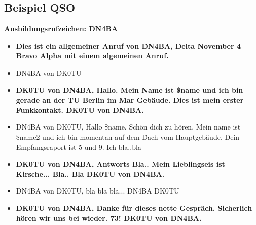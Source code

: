 \documentclass[a4paper,10pt]{article}
\begin{document}
\newpage

\subsection*{Beispiel QSO}

\textbf{Ausbildungsrufzeichen: DN4BA}

\begin{itemize}
    \item \textbf{\large Dies ist ein allgemeiner Anruf von DN4BA, Delta November 4 Bravo Alpha mit einem algemeinen Anruf.}
    \item \normalsize DN4BA von DK0TU
    \item \textbf{\large DK0TU von DN4BA, Hallo. Mein Name ist \$name und ich bin gerade an der TU Berlin im Mar Gebäude. Dies ist mein erster Funkkontakt. DK0TU von DN4BA.}
    \item \normalsize DN4BA von DK0TU, Hallo \$name. Schön dich zu hören. Mein name ist \$name2 und ich bin momentan auf dem Dach vom Hauptgebäude. Dein Empfangsraport ist 5 und 9. Ich bla..bla
    \item \textbf{\large DK0TU von DN4BA, Antworts Bla.. Mein Lieblingseis ist Kirsche... Bla.. Bla DK0TU von DN4BA.}
    \item \normalsize DN4BA von DK0TU, bla bla bla... DN4BA DK0TU
    \item \textbf{\large DK0TU von DN4BA, Danke für dieses nette Gespräch. Sicherlich hören wir uns bei wieder. 73! DK0TU von DN4BA.}
\end{itemize}
\end{document}
